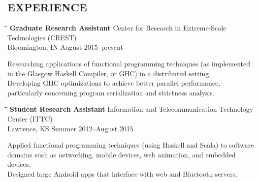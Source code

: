\documentclass{res}
\begin{document}
\begin{resume}
\section{EXPERIENCE}
   \vspace{-0.1in}
   \begin{tabbing}
   \hspace{2.3in}\= \hspace{2.5in}\= \kill %
    \textbf{Graduate Research Assistant} \> Center for Research in Extreme-Scale Technologies (CREST) \\
                             \>Bloomington, IN \> August 2015--present
   \end{tabbing}\vspace{-20pt}      %
    Researching applications of functional programming techniques (as implemented in the Glasgow Haskell Compiler, or GHC) in a distributed setting. \vspace{0.04in} \\
    Developing GHC optimizations to achieve better parallel performance, particularly concerning program serialization and strictness analysis. \\
   \vspace{-0.35in}
   \begin{tabbing}
   \hspace{2.3in}\= \hspace{2.2in}\= \kill %
    \textbf{Student Research Assistant} \> Information and Telecommunication Technology Center (ITTC) \\
                             \>Lawrence, KS \> Summer 2012--August 2015
   \end{tabbing}\vspace{-20pt}      %
    Applied functional programming techniques (using Haskell and Scala) to software domains such as networking, mobile devices, web animation, and embedded devices. \vspace{0.04in} \\
    Designed large Android apps that interface with web and Bluetooth servers.



\end{resume}
\end{document}
